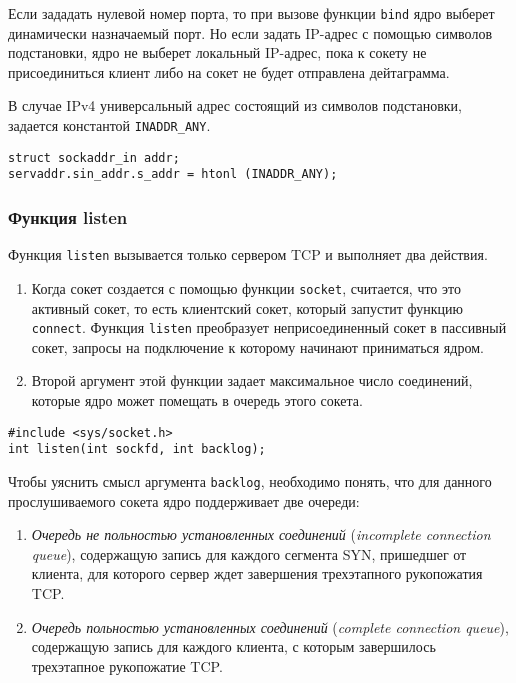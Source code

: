 Если зададать нулевой номер порта, то при вызове функции \lstinline{bind} ядро выберет динамически назначаемый порт. Но если задать IP-адрес с помощью символов подстановки, ядро не выберет локальный IP-адрес, пока к сокету не присоединиться клиент либо на сокет не будет отправлена дейтаграмма.

В случае IPv4 универсальный адрес состоящий из символов подстановки, задается константой \lstinline{INADDR_ANY}.
\lstset{language=C,caption=}
\begin{lstlisting}
struct sockaddr_in addr;
servaddr.sin_addr.s_addr = htonl (INADDR_ANY);
\end{lstlisting}

\subsubsection{Функция listen}
Функция \lstinline{listen} вызывается только сервером TCP и выполняет два действия.
\begin{enumerate}
  \item Когда сокет создается с помощью функции \lstinline{socket}, считается, что это активный сокет, то есть клиентский сокет, который запустит функцию \lstinline{connect}. Функция \lstinline{listen} преобразует неприсоединенный сокет в пассивный сокет, запросы на подключение к которому начинают приниматься ядром.
  \item Второй аргумент этой функции задает максимальное число соединений, которые ядро может помещать в очередь этого сокета.
\end{enumerate}

\lstset{language=C,caption=}
\begin{lstlisting}
#include <sys/socket.h>
int listen(int sockfd, int backlog);
\end{lstlisting}

Чтобы уяснить смысл аргумента \lstinline{backlog}, необходимо понять, что для данного прослушиваемого сокета ядро поддерживает две очереди:
\begin{enumerate}
  \item \emph{Очередь не польностью установленных соединений} (\emph{incomplete connection queue}), содержащую запись для каждого сегмента SYN, пришедшег от клиента, для которого сервер ждет завершения трехэтапного рукопожатия TCP.
  \item \emph{Очередь польностью установленных соединений} (\emph{complete connection queue}), содержащую запись для каждого клиента, с которым завершилось трехэтапное рукопожатие TCP.
\end{enumerate}

